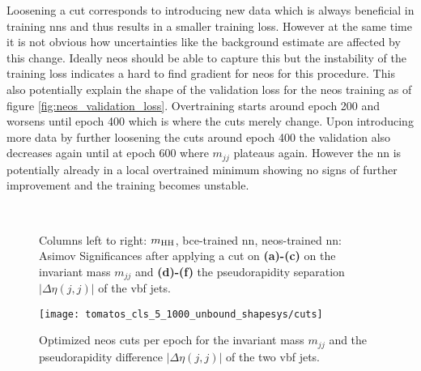 Loosening a cut corresponds to introducing new data which is always beneficial in training \acp{nn} and thus results in a smaller training loss. However at the same time it is not obvious how uncertainties like the background estimate are affected by this change. Ideally \ac{neos} should be able to capture this but the instability of the training loss indicates a hard to find gradient for \ac{neos} for this procedure. This also potentially explain the shape of the validation loss for the \ac{neos} training as of figure \ref{fig:neos_validation_loss}. Overtraining starts around epoch 200 and worsens until epoch 400 which is where the cuts merely change. Upon introducing more data by further loosening the cuts around epoch 400 the validation also decreases again until at epoch 600 where $m_{jj}$ plateaus again. However the \ac{nn} is potentially already in a local overtrained minimum showing no signs of further improvement and the training becomes unstable. 

\begin{figure}
    \centering
    \\
    \caption[]{Columns left to right: $m_\text{HH}$, \ac{bce}-trained \ac{nn}, \ac{neos}-trained \ac{nn}: Asimov Significances after applying a cut on \textbf{(a)-(c)} on the invariant mass $m_{jj}$ and \textbf{(d)-(f)} the pseudorapidity separation $|\Delta\eta(j,j)|$ of the \ac{vbf} jets.}
    \label{fig:cut_scan}
\end{figure}

\begin{figure}
    \centering
    \texttt{[image: tomatos\_cls\_5\_1000\_unbound\_shapesys/cuts]}
    \caption[]{Optimized \ac{neos} cuts per epoch for the invariant mass $m_{jj}$ and the pseudorapidity difference $|\Delta\eta(j,j)|$ of the two \ac{vbf} jets.}
    \label{fig:neos_cuts}
\end{figure}

